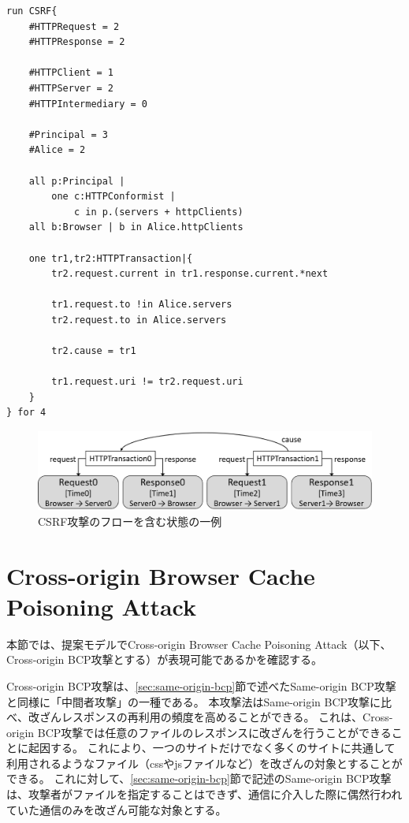\documentclass[12pt,a4paper]{jbook}
\begin{document}
\begin{lstlisting}[caption=CSRF攻撃の表現, label=code:CSRF]
run CSRF{
	#HTTPRequest = 2
	#HTTPResponse = 2

	#HTTPClient = 1
	#HTTPServer = 2
	#HTTPIntermediary = 0

	#Principal = 3
	#Alice = 2

	all p:Principal |
		one c:HTTPConformist |
			c in p.(servers + httpClients)
	all b:Browser | b in Alice.httpClients

	one tr1,tr2:HTTPTransaction|{
		tr2.request.current in tr1.response.current.*next

		tr1.request.to !in Alice.servers
		tr2.request.to in Alice.servers

		tr2.cause = tr1

		tr1.request.uri != tr2.request.uri
	}
} for 4
\end{lstlisting}

\begin{figure}[htb]
\centering
\includegraphics[width=450pt]{./fig/CSRF_alloy.eps}
\caption{CSRF攻撃のフローを含む状態の一例}
\label{fig:CSRF_alloy}
\end{figure}

\section{Cross-origin Browser Cache Poisoning Attack}
本節では、提案モデルでCross-origin Browser Cache Poisoning Attack\cite{bcpattack}（以下、Cross-origin BCP攻撃とする）が表現可能であるかを確認する。

Cross-origin BCP攻撃は、\ref{sec:same-origin-bcp}節で述べたSame-origin BCP攻撃と同様に「中間者攻撃」の一種である。
本攻撃法はSame-origin BCP攻撃に比べ、改ざんレスポンスの再利用の頻度を高めることができる。
これは、Cross-origin BCP攻撃では任意のファイルのレスポンスに改ざんを行うことができることに起因する。
これにより、一つのサイトだけでなく多くのサイトに共通して利用されるようなファイル（cssやjsファイルなど）を改ざんの対象とすることができる。
これに対して、\ref{sec:same-origin-bcp}節で記述のSame-origin BCP攻撃は、攻撃者がファイルを指定することはできず、通信に介入した際に偶然行われていた通信のみを改ざん可能な対象とする。
\end{document}

